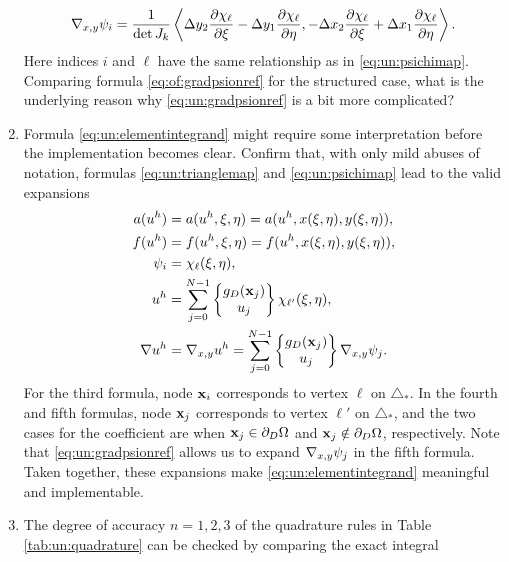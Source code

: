 \begin{enumerate}
\begin{equation}
\nabla_{x,y} \psi_i = \frac{1}{\det J_k} \left<\Delta y_2 \frac{\partial \chi_\ell}{\partial \xi} - \Delta y_1 \frac{\partial \chi_\ell}{\partial \eta}, - \Delta x_2 \frac{\partial \chi_\ell}{\partial \xi} + \Delta x_1 \frac{\partial \chi_\ell}{\partial \eta}\right>. \label{eq:un:gradpsionref}
\end{equation}
Here indices $i$ and $\ell$ have the same relationship as in \eqref{eq:un:psichimap}.  Comparing formula \eqref{eq:of:gradpsionref} for the structured case, what is the underlying reason why \eqref{eq:un:gradpsionref} is a bit more complicated?  %
\item  \label{exer:un:elementintegranddetails}  Formula \eqref{eq:un:elementintegrand} might require some interpretation before the implementation becomes clear.  Confirm that, with only mild abuses of notation, formulas \eqref{eq:un:trianglemap} and \eqref{eq:un:psichimap} lead to the valid expansions
\begin{align*}
a(u^h) &= a(u^h,\xi,\eta) = a(u^h,x(\xi,\eta),y(\xi,\eta)), \\
f(u^h) &= f(u^h,\xi,\eta) = f(u^h,x(\xi,\eta),y(\xi,\eta)), \\
\psi_i &= \chi_{\ell}(\xi,\eta), \\
u^h &= \sum_{j=0}^{N-1} \left\{\begin{matrix} g_D(\mathbf{x}_j) \\ u_j \end{matrix}\right\} \chi_{\ell'}(\xi,\eta), \\
\nabla u^h &= \nabla_{x,y} u^h = \sum_{j=0}^{N-1} \left\{\begin{matrix} g_D(\mathbf{x}_j) \\ u_j \end{matrix}\right\} \nabla_{x,y} \psi_j.
\end{align*}
For the third formula, node $\mathbf{x}_i$ corresponds to vertex $\ell$ on $\triangle_\ast$.  In the fourth and fifth formulas, node $\mathbf{x}_j$ corresponds to vertex $\ell'$ on $\triangle_\ast$, and the two cases for the coefficient are when $\mathbf{x}_j \in \partial_D \Omega$ and $\mathbf{x}_j \notin \partial_D \Omega$, respectively.  Note that \eqref{eq:un:gradpsionref} allows us to expand $\nabla_{x,y} \psi_j$ in the fifth formula.  Taken together, these expansions make \eqref{eq:un:elementintegrand} meaningful and implementable.
\item  \label{exer:un:checkquadrature}  The degree of accuracy $n=1,2,3$ of the quadrature rules in Table \ref{tab:un:quadrature} can be checked by comparing the exact integral

\end{enumerate}
